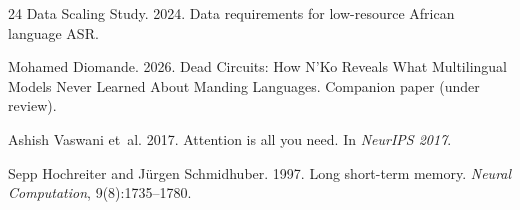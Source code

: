 \documentclass[11pt]{article}
\begin{document}
\begin{thebibliography}{24}
{Data Scaling Study}. 2024.
\newblock Data requirements for low-resource {African} language {ASR}.

Mohamed Diomande. 2026.
\newblock Dead Circuits: How {N'Ko} Reveals What Multilingual Models Never Learned About {Manding} Languages.
\newblock Companion paper (under review).

Ashish Vaswani et~al. 2017.
\newblock Attention is all you need.
\newblock In \emph{NeurIPS 2017}.

Sepp Hochreiter and J\"{u}rgen Schmidhuber. 1997.
\newblock Long short-term memory.
\newblock \emph{Neural Computation}, 9(8):1735--1780.


\end{thebibliography}
\end{document}
